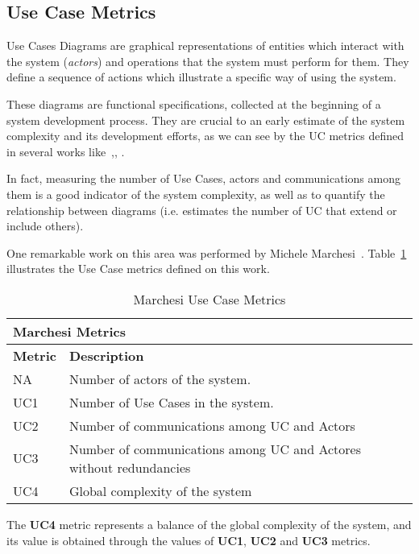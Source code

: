 \subsection{Use Case Metrics}

Use Cases Diagrams are graphical representations of entities which interact with the system (\emph{actors}) and operations that the system must perform for them.
They define a sequence of actions which illustrate a specific way of using the system.

These diagrams are functional specifications, collected at the beginning of a system development process.
They are crucial to an early estimate of the system complexity and its development efforts, as we can see by the UC metrics defined in several works like~\cite{Kim02developingsoftware},\cite{Mohagheghi05effortestimation}, \cite{Ribu01estimatingobject-oriented}.

In fact, measuring the number of Use Cases, actors and communications among them is a good indicator of the system complexity, as well as to quantify the relationship between diagrams (i.e. estimates the number of UC that extend or include others).

One remarkable work on this area was performed by Michele Marchesi~\cite{Marchesi:1998:OMU:522081.795010}.
Table~\ref{t:ucm} illustrates the Use Case metrics defined on this work. 
 
\begin{table}[h]\centering
\begin{tabular}{ p{} | p{10.5cm}}
\multicolumn{2}{l}{\textbf{Marchesi Metrics}} \\ \hline
\textbf{Metric} & \textbf{Description} \\ \hline
NA & Number of actors of the system. \\ \hline
UC1 & Number of Use Cases in the system. \\ \hline 
UC2 & Number of communications among UC and Actors  \\ \hline 
UC3 & Number of communications among UC and Actores without redundancies \\ \hline 
UC4 & Global complexity of the system \\ \hline 
\end{tabular}
\caption{\small{Marchesi Use Case Metrics}}
\label{t:ucm}
\end{table}

The \textbf{UC4} metric represents a balance of the global complexity of the system, and its value is obtained through the values of \textbf{UC1}, \textbf{UC2} and \textbf{UC3} metrics.
